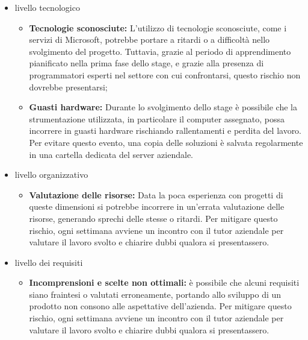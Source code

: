 \begin{itemize}
	\item livello tecnologico
	\begin{itemize}
		\item \textbf{Tecnologie sconosciute:} L'utilizzo di tecnologie sconosciute, come i servizi di Microsoft, potrebbe portare a ritardi o a difficoltà nello svolgimento del progetto. Tuttavia, grazie al periodo di apprendimento pianificato nella prima fase dello stage, e grazie alla presenza di programmatori esperti nel settore con cui confrontarsi, questo rischio non dovrebbe presentarsi;
		\item \textbf{Guasti hardware:} Durante lo svolgimento dello stage è possibile che la strumentazione utilizzata, in particolare il computer assegnato, possa incorrere in guasti hardware rischiando rallentamenti e perdita del lavoro. Per evitare questo evento, una copia delle soluzioni è salvata regolarmente in una cartella dedicata del server aziendale.   
	\end{itemize}
	\item livello organizzativo
	\begin{itemize}
		\item \textbf{Valutazione delle risorse:} Data la poca esperienza con progetti di queste dimensioni si potrebbe incorrere in un'errata valutazione delle risorse, generando sprechi delle stesse o ritardi. Per mitigare questo rischio, ogni settimana avviene un incontro con il tutor aziendale per valutare il lavoro svolto e chiarire dubbi qualora si presentassero.
	\end{itemize}
	\item livello dei requisiti
	\begin{itemize}
		\item \textbf{Incomprensioni e scelte non ottimali:} è possibile che alcuni requisiti siano fraintesi o valutati erroneamente, portando allo sviluppo di un prodotto non consono alle aspettative dell'azienda. Per mitigare questo rischio, ogni settimana avviene un incontro con il tutor aziendale per valutare il lavoro svolto e chiarire dubbi qualora si presentassero.
	\end{itemize}
\end{itemize}

